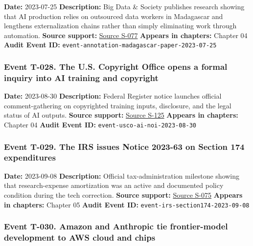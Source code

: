 \documentclass[
  american,
  11pt,
  letterpaper,
]{article}
\begin{document}
\textbf{Date:} 2023-07-25 \textbf{Description:} Big Data \& Society
publishes research showing that AI production relies on outsourced data
workers in Madagascar and lengthens externalization chains rather than
simply eliminating work through automation. \textbf{Source support:}
\hyperref[source-s-077-the-problem-with-annotation-human-labour-and-outsourcing-between-france-and-madagascar]{Source
S-077} \textbf{Appears in chapters:} Chapter 04 \textbf{Audit Event ID:}
\texttt{event-annotation-madagascar-paper-2023-07-25}

\subsubsection{Event T-028. The U.S. Copyright Office opens a formal
inquiry into AI training and
copyright}\label{event-t-028-the-u-s-copyright-office-opens-a-formal-inquiry-into-ai-training-and-copyright}

\textbf{Date:} 2023-08-30 \textbf{Description:} Federal Register notice
launches official comment-gathering on copyrighted training inputs,
disclosure, and the legal status of AI outputs. \textbf{Source support:}
\hyperref[source-s-125-copyright-and-artificial-intelligence-notice-of-inquiry]{Source
S-125} \textbf{Appears in chapters:} Chapter 04 \textbf{Audit Event ID:}
\texttt{event-usco-ai-noi-2023-08-30}

\subsubsection{Event T-029. The IRS issues Notice 2023-63 on Section 174
expenditures}\label{event-t-029-the-irs-issues-notice-2023-63-on-section-174-expenditures}

\textbf{Date:} 2023-09-08 \textbf{Description:} Official
tax-administration milestone showing that research-expense amortization
was an active and documented policy condition during the tech
correction. \textbf{Source support:}
\hyperref[source-s-075-notice-2023-63-guidance-on-section-174-and-specified-research-or-experimental-expenditures]{Source
S-075} \textbf{Appears in chapters:} Chapter 05 \textbf{Audit Event ID:}
\texttt{event-irs-section174-2023-09-08}

\subsubsection{Event T-030. Amazon and Anthropic tie frontier-model
development to AWS cloud and
chips}\label{event-t-030-amazon-and-anthropic-tie-frontier-model-development-to-aws-cloud-and-chips}
\end{document}
